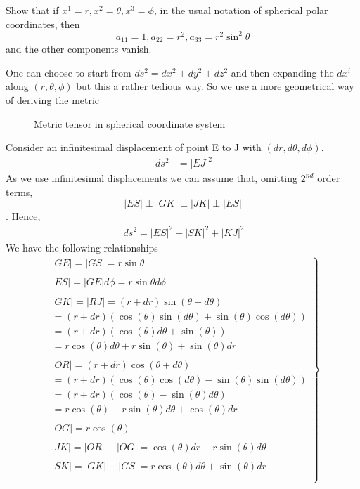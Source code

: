 \begin{tcolorbox}
Show that if $x^1 = r, x^2 = \theta, x^3 = \phi$, in the usual notation of spherical polar coordinates, then $$ a_{11} =1, a_{22} = r^2, a_{33} = r^2\sin^2\theta$$ and the other components vanish.
\end{tcolorbox}
One can choose to start from $ds^2 = dx^2+dy^2+dz^2$ and then expanding the $dx^i$ along $(r,\theta,\phi)$ but this a rather tedious way. So we use a more geometrical way of deriving the metric\\
\begin{figure}[htp] 
    \centering

\caption{Metric tensor in spherical coordinate system}
\label{fig:fig_p27_22_a}
\end{figure}
Consider an infinitesimal displacement of point E to J with $(dr,d\theta, d\phi )$.
\begin{align}
\ ds^2 &= |EJ|^2
\end{align}
As we use infinitesimal displacements we can assume that, omitting $2^{nd}$ order terms, $$|ES|\perp|GK|\perp|JK|\perp|ES|$$. Hence,
\begin{align}
\ ds^2 = |ES|^2+|SK|^2+|KJ|^2
\end{align}
We have the following relationships
\begin{align}
\left.
\begin{array}{c}
\ |GE| = |GS| = r\sin\theta\\\\
\ |ES| = |GE|d\phi = r\sin\theta d\phi\\\\
\ |GK| = |RJ| = (r+dr)\sin(\theta+d\theta) \\
\ =(r+dr)(\cos(\theta)\sin(d\theta)+\sin(\theta)\cos(d\theta) )\\
\ = (r+dr)(\cos(\theta)d\theta+\sin(\theta))\\
\ = r\cos(\theta)d\theta+r\sin(\theta)+\sin(\theta)dr\\\\
\ |OR| =  (r+dr)\cos(\theta+d\theta)\\
\ = (r+dr)(\cos(\theta)\cos(d\theta)-\sin(\theta)\sin(d\theta))\\
\ = (r+dr)(\cos(\theta)-\sin(\theta)d\theta)\\
\ = r\cos(\theta)-r\sin(\theta)d\theta + \cos(\theta)dr\\\\
\ |OG| = r\cos(\theta)\\\\
\ |JK| = |OR|-|OG| = \cos(\theta)dr-r\sin(\theta)d\theta\\\\
\ |SK| = |GK|-|GS| = r\cos(\theta)d\theta+\sin(\theta)dr\\\\
\end{array}
\right\}
\end{align}
